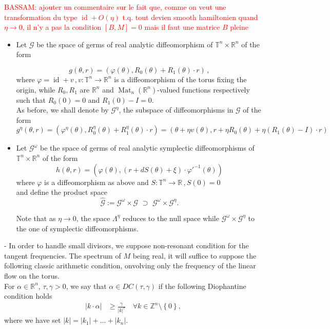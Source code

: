 \documentclass[oneside, 11pt]{amsbook}
\newcommand{\set}[1]{{\left\{#1\right\}}}
\newcommand{\abs}[1]{{\left|#1\right|}}
\newcommand{\T}{\mathbb{T}}
\newcommand{\Z}{\mathbb{Z}}
\newcommand{\R}{\mathbb{R}}
\newcommand{\teta}{\theta}
\newcommand{\Mat}{\operatorname{Mat}}
\newcommand{\id}{\operatorname{id}}
\newcommand{\cG}{{\mathcal G}}
\newcommand{\0}{{(0)}}
\newcommand{\3}{{(3)}}
\newcommand{\red}[1]{\textcolor{red}{#1}}
\numberwithin{equation}{section}
\numberwithin{defn}{section}
\numberwithin{prop}{section}
\numberwithin{cor}{section}
\numberwithin{lemma}{section}
\numberwithin{rmk}{section}
\numberwithin{corollary}{section}
\begin{document}
\red{BASSAM: ajouter un commentaire sur le fait que, comme on veut une transformation du type $\id + O(\eta)$ t.q. tout devien smooth hamiltonien quand $\eta\to 0$, il n'y a pas la condition $[B,M] = 0$ mais il faut une matrice $B$ pleine}\\ 
\begin{itemize}[leftmargin=*]
\item  Let $\cG$ be the space of germs of real analytic diffeomorphism of $\T^n\times\R^n$ of the form 

\begin{equation}\label{diffeo dissip}
	g(\teta,r) = (\varphi(\teta), R_0(\teta) + R_1(\teta)\cdot r)\,,
\end{equation} 
where $\varphi = \id + v\,, v:\T^n\to\R^n$ is a diffeomorphism of the torus fixing the origin, while $R_0, R_1$ are  $\R^n$ and $\Mat_n(\R^n)$-valued functions respectively such that $R_0(0)=0$ and $R_1(0) - I = 0$.\\
As before, we shall denote by $\cG^\eta$, the subspace of diffeomorphisms in $\cG$ of the form 
$$
g^\eta (\teta,r) = (\varphi^\eta(\teta), R^\eta_0(\teta) + R^\eta_1(\teta)\cdot r) = (\teta + \eta v(\teta), r + \eta R_0(\teta) +\eta (R_1(\teta) - I)\cdot r)
$$

\item Let $\cG^\omega$ be the space of germs of real analytic symplectic diffeomorphisms of $\T^n\times\R^n$ of the form 
\begin{equation}\label{diffeo symp}
	h(\teta,r) = (\varphi(\teta), (r + dS(\teta) + \xi)\cdot\varphi'^{-1}(\teta))
\end{equation}
where $\varphi$ is a diffeomorphism as above and $S:\T^n\to \R\,, S(0)=0$  \\
 and define the product space 
$$
\hat \cG := \cG^\omega\times\cG \, \, \supset\,\,  \cG^\omega\times\cG^\eta  .
$$

Note that as $\eta\to 0$, the space $\Lambda^\eta$ reduces to the null space while $\cG^\omega\times\cG^\eta$ to the one of symplectic diffeomorphisms.
\end{itemize}

- In order to handle small divisors, we suppose non-resonant condition for the tangent frequencies. The spectrum of $M$ being real, it will suffice to suppose the following classic arithmetic condition, onvolving only the frequency of the linear flow on the torus.\\
 For $\alpha\in\R^n$,%
	$\tau,\gamma>0$, 
	we say that $\alpha \in DC(\tau,\gamma)$ if the following Diophantine condition holds
	\begin{align}
		\abs{k\cdot\alpha}&\geq \frac{\gamma}{\abs{k}^\tau}\quad\forall k\in\Z^n\setminus\set{0},\end{align}
	where we have set $\abs{k} = \abs{k_1} + \ldots + \abs{k_n}$.\\
\end{document}
